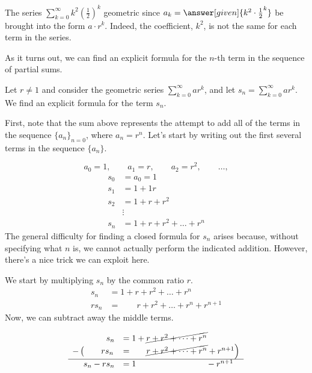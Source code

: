 \documentclass{ximera}
\begin{document}
\begin{example}
The series $\sum_{k=0}^\infty k^2 \left(\frac{1}{2}\right)^k$  geometric since $a_k = \answer[given]{k^2 \cdot \frac{1}{2}^k}$  be brought into the form $a \cdot r^k$.  Indeed, the coefficient, $k^2$, is not the same for each term in the series.
\end{example}

As it turns out, we can find an explicit formula for the $n$-th term in the sequence of partial sums.


\begin{example}
 Let $r \neq 1$ and consider the geometric series $\sum_{k=0}^\infty a r^k$, and let $s_n = \sum_{k=0}^{\infty} a r^k $.  We find an explicit formula for the term $s_n$.
  
  \begin{explanation}
First, note that the sum above represents the attempt to add all of the terms in the sequence $\{a_n\}_{n=0}$, where $a_n =  r^n$.  Let's start by writing out the first several terms in the sequence $\{a_n\}$.  

\[
a_0 = 1 , \qquad a_1 = r, \qquad a_2 = r^2 , \qquad \ldots ,
\]
    \begin{align*}
      s_0 &= a_0 = 1 \\
      s_1 &= 1 + 1r\\
      s_2 &= 1 + r + r^2\\
      &\vdots\\
      s_n &= 1 + r + r^2 + \dots + r^n
    \end{align*}
The general difficulty for finding a closed formula for $s_n$ arises because, without specifying what $n$ is, we cannot actually perform the indicated addition.  However, there's a nice trick we can exploit here.

We start by multiplying $s_n$ by the common ratio $r$.
    \begin{align*}
      s_n   &= 1 + r + r^2 + \dots + r^n\\
      r s_n &= ~ \phantom{ 1 + } r + r^2 + \dots + r^n + r^{n+1}
    \end{align*}
Now, we can subtract away the middle terms.

 \[     \begin{array}{rl}
      s_n   &= 1 + \cancel{ r + r^2 + \dots + r^n}\\
 -\left(  \phantom{ r^{n+1}} r s_n \right.&=~ \left. \phantom{  1 +  } \cancel{r + r^2 + \dots + r^n} + r^{n+1}\right) \\
 \hline 
     s_n - r s_n &= 1 \phantom{  +  r + r^2 + \dots + r^n } ~ - r^{n+1}\\
    \end{array}
 \]   
 

\end{explanation}
\end{example}
\end{document}
